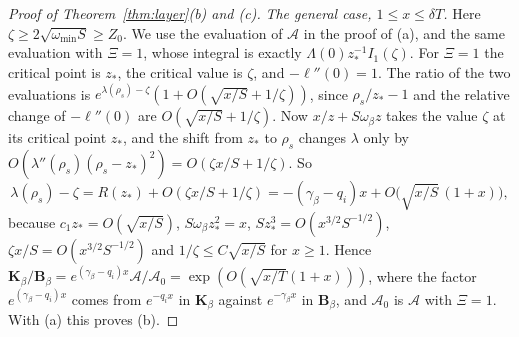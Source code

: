 \begin{proof}[Proof of Theorem~\ref{thm:layer}\textup{(b)} and \textup{(c)}]
\emph{The general case, $1\le x\le\delta T$.} Here $\zeta\ge2\sqrt{\omega_{\min}S}\ge Z_0$. We
use the evaluation of $\mathcal A$ in the proof of (a), and the same evaluation with
$\Xi=1$, whose integral is exactly $\Lambda(0)z_*^{-1}I_1(\zeta)$. For $\Xi=1$ the
critical point is $z_*$, the critical value is $\zeta$, and $-\ell''(0)=1$. The ratio of the two
evaluations is $e^{\lambda(\rho_s)-\zeta}(1+O(\sqrt{x/S}+1/\zeta))$, since
$\rho_s/z_*-1$ and the relative change of $-\ell''(0)$ are $O(\sqrt{x/S}+1/\zeta)$. Now
$x/z+S\omega_\beta z$ takes the value $\zeta$ at its critical point $z_*$, and the shift from
$z_*$ to $\rho_s$ changes $\lambda$ only by
$O(\lambda''(\rho_s)(\rho_s-z_*)^2)=O(\zeta x/S+1/\zeta)$. So
\[
\lambda(\rho_s)-\zeta=R(z_*)+O(\zeta x/S+1/\zeta)=-(\gamma_\beta-q_i)x+O\bigl(\sqrt{x/S}\,(1+x)\bigr),
\]
because $c_1z_*=O(\sqrt{x/S})$, $S\omega_\beta z_*^2=x$, $Sz_*^3=O(x^{3/2}S^{-1/2})$,
$\zeta x/S=O(x^{3/2}S^{-1/2})$ and $1/\zeta\le C\sqrt{x/S}$ for $x\ge1$. Hence
$\mathbf K_\beta/\mathbf B_\beta=e^{(\gamma_\beta-q_i)x}\mathcal A/\mathcal A_0=\exp(O(\sqrt{x/T}(1+x)))$,
where the factor $e^{(\gamma_\beta-q_i)x}$ comes from $e^{-q_ix}$ in $\mathbf K_\beta$ against $e^{-\gamma_\beta x}$ in
$\mathbf B_\beta$, and $\mathcal A_0$ is $\mathcal A$ with $\Xi=1$. With (a) this proves (b).
\end{proof}

